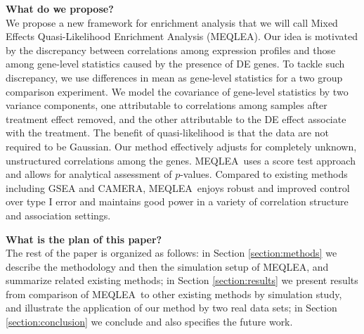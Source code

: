 \documentclass[a4,center,fleqn]{NAR}
\newcommand{\OurMethod}{MEQLEA}
\begin{document}
	
	
	\textbf{What do we propose?} \\
	We propose a new framework for enrichment analysis that we will call Mixed Effects Quasi-Likelihood
	Enrichment Analysis (\OurMethod). Our idea is motivated by the discrepancy between correlations
	among expression profiles and those among gene-level statistics caused by the presence of DE genes.
	To tackle such discrepancy, we use differences in mean as gene-level statistics for a two group
	comparison experiment. We model the covariance of gene-level statistics by two variance components,
	one attributable to correlations among samples after treatment effect removed, and the other
	attributable to the DE effect associate with the treatment. The benefit of quasi-likelihood is that
	the data are not required to be Gaussian. Our method effectively adjusts for completely unknown,
	unstructured correlations among the genes. \OurMethod~uses a score test approach and allows for
	analytical assessment of $p$-values. Compared to existing methods including GSEA and CAMERA,
	\OurMethod~enjoys robust and improved control over type I error and maintains good power in a
	variety of correlation structure and association settings. 
	
	\textbf{What is the plan of this paper?} \\
	The rest of the paper is organized as follows: in Section \ref{section:methods} we describe the
	methodology and then the simulation setup of \OurMethod, and summarize related existing methods; in
	Section \ref{section:results} we present results from comparison of \OurMethod~to other existing
	methods by simulation study, and illustrate the application of our method by two real data sets; in
	Section \ref{section:conclusion} we conclude and also specifies the future work.
	
	
	
\end{document}
